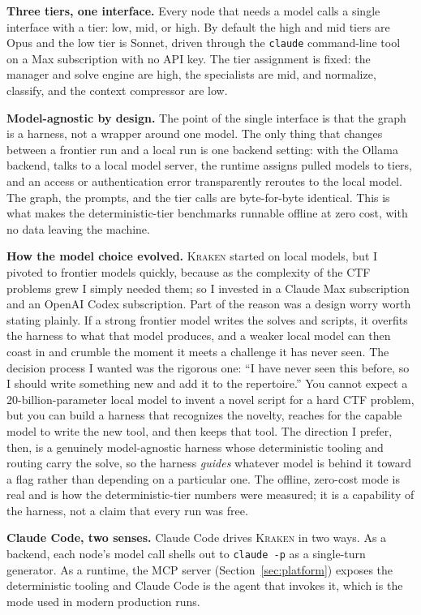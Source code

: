 \documentclass[10pt,twocolumn]{article}
\newcommand{\kraken}{\textsc{Kraken}}
\newcommand{\code}[1]{\seqsplit{\texttt{#1}}}
\begin{document}
\textbf{Three tiers, one interface.} Every node that needs a model calls a single \code{direct\_generate}
interface with a tier: low, mid, or high. By default the high and mid tiers are Opus and the low tier is
Sonnet, driven through the \texttt{claude} command-line tool on a Max subscription with no API key. The tier
assignment is fixed: the manager and solve engine are high, the specialists are mid, and normalize,
classify, and the context compressor are low.

\medskip
\textbf{Model-agnostic by design.} The point of the single interface is that the graph is a harness, not a
wrapper around one model. The only thing that changes between a frontier run and a local run is one backend
setting: with the Ollama backend, \code{direct\_generate} talks to a local model server, the runtime assigns
pulled models to tiers, and an access or authentication error transparently reroutes to the local model. The
graph, the prompts, and the tier calls are byte-for-byte identical. This is what makes the deterministic-tier
benchmarks runnable offline at zero cost, with no data leaving the machine.

\medskip
\textbf{How the model choice evolved.} \kraken{} started on local models, but I pivoted to frontier
models quickly, because as the complexity of the CTF problems grew I simply needed them; so I invested in a
Claude Max subscription and an OpenAI Codex subscription. Part of the reason was a design worry worth stating
plainly. If a strong frontier model writes the solves and scripts, it overfits the harness to what that model
produces, and a weaker local model can then coast in and crumble the moment it meets a challenge it has never
seen. The decision process I wanted was the rigorous one: ``I have never seen this before, so I should write
something new and add it to the repertoire.'' You cannot expect a 20-billion-parameter local model to invent a
novel script for a hard CTF problem, but you can build a harness that recognizes the novelty, reaches for the
capable model to write the new tool, and then keeps that tool. The direction I prefer, then, is a genuinely
model-agnostic harness whose deterministic tooling and routing carry the solve, so the harness \emph{guides}
whatever model is behind it toward a flag rather than depending on a particular one. The offline, zero-cost
mode is real and is how the deterministic-tier numbers were measured; it is a capability of the harness, not a
claim that every run was free.

\medskip
\textbf{Claude Code, two senses.} Claude Code drives \kraken{} in two ways. As a backend, each node's model
call shells out to \texttt{claude -p} as a single-turn generator. As a runtime, the MCP server
(Section~\ref{sec:platform}) exposes the deterministic tooling and Claude Code is the agent that invokes it,
which is the mode used in modern production runs.
\end{document}
